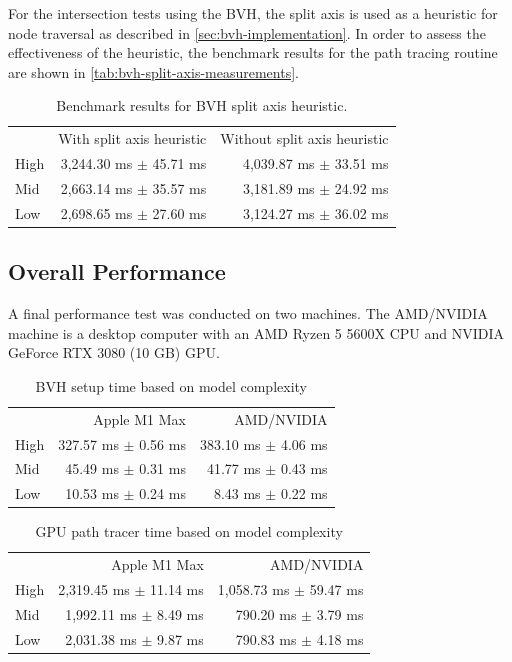 For the intersection tests using the \gls{BVH}, the split axis is used as a heuristic for node traversal as described in \autoref{sec:bvh-implementation}. In order to assess the effectiveness of the heuristic, the benchmark results for the path tracing routine are shown in \autoref{tab:bvh-split-axis-measurements}.

\begin{table}[H]
    \centering
    \begin{tabular}{@{}lrr@{}}
    \toprule
    & With split axis heuristic & Without split axis heuristic \\
    High & 3,244.30 ms $\pm$ 45.71 ms & 4,039.87 ms $\pm$ 33.51 ms \\
    Mid & 2,663.14 ms $\pm$ 35.57 ms & 3,181.89 ms $\pm$ 24.92 ms \\
    Low & 2,698.65 ms $\pm$ 27.60 ms & 3,124.27 ms $\pm$ 36.02 ms \\
    \bottomrule
    \end{tabular}
    \caption{Benchmark results for \gls{BVH} split axis heuristic.}
    \label{tab:bvh-split-axis-measurements}
\end{table}

\subsection*{Overall Performance}

A final performance test was conducted on two machines. The AMD/NVIDIA machine is a desktop computer with an AMD Ryzen 5 5600X \gls{CPU} and NVIDIA GeForce RTX 3080 (10 GB) \gls{GPU}.

\begin{table}[H]
  \centering
  \begin{tabular}{lrr}
    \toprule
    & Apple M1 Max    & AMD/NVIDIA \\
    High     & 327.57 ms $\pm$ 0.56 ms     & 383.10 ms $\pm$ 4.06 ms \\
    Mid     & 45.49 ms $\pm$ 0.31 ms    & 41.77 ms $\pm$ 0.43 ms \\
    Low     & 10.53 ms $\pm$ 0.24 ms    & 8.43 ms $\pm$ 0.22 ms \\
    \bottomrule
  \end{tabular}
  \caption{\gls{BVH} setup time based on model complexity}
  \label{tab:cpuPerformance}
\end{table}

\begin{table}[H]
  \centering
  \begin{tabular}{lrr}
    \toprule
    & Apple M1 Max    & AMD/NVIDIA \\
    High     & 2,319.45 ms $\pm$ 11.14 ms    & 1,058.73 ms $\pm$ 59.47 ms \\
    Mid     & 1,992.11 ms $\pm$ 8.49 ms    & 790.20 ms $\pm$ 3.79 ms\\
    Low     & 2,031.38 ms $\pm$ 9.87 ms    & 790.83 ms $\pm$ 4.18 ms \\
    \bottomrule
  \end{tabular}
  \caption{\gls{GPU} path tracer time based on model complexity}
  \label{tab:gpuPerformance}
\end{table}
  
